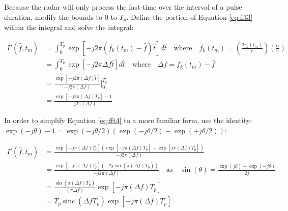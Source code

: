 \documentclass[fleqn,10pt]{olplainarticle}
\DeclareMathOperator{\sinc}{sinc}
\begin{document}
\noindent Because the radar will only process the fast-time over the interval of a pulse duration, modify the bounds to $0$ to $T_{p}$. Define the portion of Equation \ref{eq:fft3} within the integral and solve the integral:

\begin{equation}
    \begin{aligned}
        I'(\hat{f}, t_{m})
         &= \int_{0}^{T_{p}} 
        \exp \left[ -j 2\pi \left( f_{k}(t_{m}) - \hat{f} \right)\hat{t}\right]
         d\hat{t} \quad \mathrm{where} \quad f_{k}(t_{m}) = \left( \frac{2 r_{k}(t_{m})}{c} \right) \left(\frac{\alpha}{\pi}\right)\\
         &= \int_{0}^{T_{p}} 
        \exp \left[ -j 2\pi \Delta f \hat{t}\right]
         d\hat{t} \quad \mathrm{where} \quad \Delta f = f_{k}(t_{m}) - \hat{f}\\
         &= \frac{\exp \left[ -j 2\pi \left( \Delta f \right)\hat{t}\right]}{-j 2\pi \left( \Delta f \right)} \bigg\rvert_{0}^{T_p}\\
         &= \frac{\exp \left[ -j 2\pi \left( \Delta f \right)T_p\right] - 1}{-j 2\pi \left( \Delta f \right)}
    \end{aligned}
    \label{eq:fft4}
\end{equation}

\noindent In order to simplify Equation \ref{eq:fft4} to a more familiar form, use the identity: \\$\exp(-j\theta)-1 = \exp(-j\theta/2)(\exp(-j\theta/2) - \exp(+j\theta/2))$:

\begin{equation}
    \begin{aligned}
        I'(\hat{f}, t_{m})
         &= \frac{\exp \left[ -j \pi \left( \Delta f \right)T_p\right]\left( \exp \left[ -j \pi \left( \Delta f \right)T_p\right] - \exp \left[ j \pi \left( \Delta f \right)T_p\right] \right)}{-j 2\pi \left( \Delta f \right)} \\
         &= \frac{\exp \left[ -j \pi \left( \Delta f \right)T_p\right]\left( -2j\sin(\pi \left( \Delta f \right)T_p) \right)}{-j 2\pi \left( \Delta f \right)} \quad \mathrm{as} \quad \sin(\theta) = \frac{\exp(j\theta) - \exp{(-j\theta)}}{2j} \\
         &= \frac{\sin(\pi \left( \Delta f \right)T_p) }{\left(\pi \Delta f \right)}\exp \left[ -j \pi \left( \Delta f \right)T_p\right]\\
         &= T_p \sinc (\Delta f T_p)\exp \left[ -j \pi \left( \Delta f \right)T_p\right]
    \end{aligned}
    \label{eq:fft5}
\end{equation}
\end{document}

